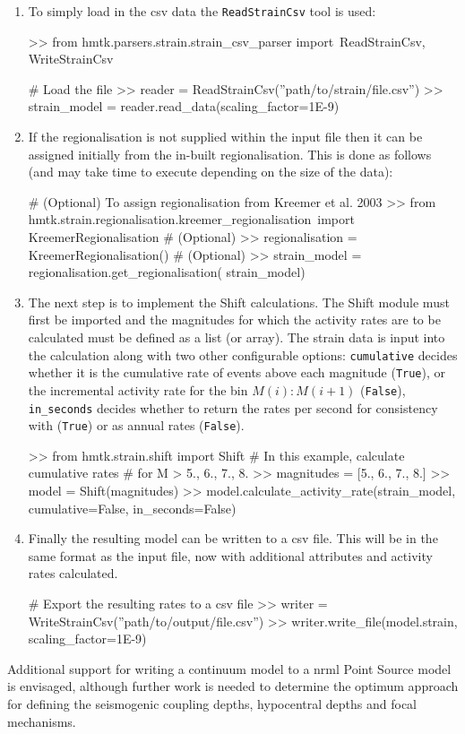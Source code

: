 \begin{enumerate}

\item To simply load in the csv data the \verb=ReadStrainCsv= tool is used:

\begin{python}[frame=single]
>> from hmtk.parsers.strain.strain_csv_parser import\
    ReadStrainCsv, WriteStrainCsv

# Load the file
>> reader = ReadStrainCsv(''path/to/strain/file.csv'')
>> strain_model = reader.read_data(scaling_factor=1E-9)
\end{python}

\item If the regionalisation is not supplied within the input file then it can be assigned initially from the in-built \textcite{Kreemer_etal2003} regionalisation. This is done as follows (and may take time to execute depending on the size of the data):

\begin{python}[frame=single]
# (Optional) To assign regionalisation from Kreemer et al. 2003
>> from hmtk.strain.regionalisation.kreemer_regionalisation\
    import KreemerRegionalisation
# (Optional)
>> regionalisation = KreemerRegionalisation()
# (Optional)
>> strain_model = regionalisation.get_regionalisation(
    strain_model)
\end{python}

\item The next step is to implement the Shift calculations. The Shift module must first be imported and the magnitudes for which the activity rates are to be calculated must be defined as a list (or array). The strain data is input into the calculation along with two other configurable options: \verb=cumulative= decides whether it is the cumulative rate of events above each magnitude (\verb=True=), or the incremental activity rate for the bin $M \left( i \right):M \left( {i + 1} \right)$ (\verb=False=), \verb=in_seconds= decides whether to return the rates per second for consistency with \textcite{Bird_etal2010} (\verb=True=) or as annual rates (\verb=False=). 

\begin{python}[frame=single]
>> from hmtk.strain.shift import Shift
# In this example, calculate cumulative rates 
# for M > 5., 6., 7., 8.
>> magnitudes = [5., 6., 7., 8.]
>> model = Shift(magnitudes)
>> model.calculate_activity_rate(strain_model,
                                 cumulative=False,
                                 in_seconds=False)
\end{python}

\item Finally the resulting model can be written to a csv file. This will be in the same format as the input file, now with additional attributes and activity rates calculated.

\begin{python}[frame=single]
# Export the resulting rates to a csv file
>> writer = WriteStrainCsv(''path/to/output/file.csv'')
>> writer.write_file(model.strain, scaling_factor=1E-9)
\end{python}
\end{enumerate}

Additional support for writing a continuum model to a nrml Point Source model is envisaged, although further work is needed to determine the optimum approach for defining the seismogenic coupling depths, hypocentral depths and focal mechanisms. 
